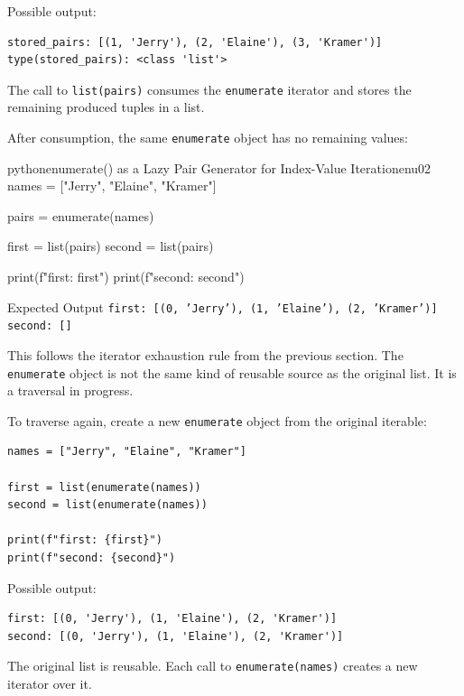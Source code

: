 \documentclass[a4paper,twoside]{report}
\begin{document}
Possible output:

\begin{verbatim}
stored_pairs: [(1, 'Jerry'), (2, 'Elaine'), (3, 'Kramer')]
type(stored_pairs): <class 'list'>
\end{verbatim}

The call to \texttt{list(pairs)} consumes the \texttt{enumerate} iterator and stores the remaining produced tuples in a list.

After consumption, the same \texttt{enumerate} object has no remaining values:

\begin{codebox}[]{python}{enumerate() as a Lazy Pair Generator for Index-Value Iteration}{enu02}
names = ["Jerry", "Elaine", "Kramer"]

pairs = enumerate(names)

first = list(pairs)
second = list(pairs)

print(f"first: {first}")
print(f"second: {second}")
\end{codebox}


\begin{iobox}{Expected Output}
\texttt{first: [(0, 'Jerry'), (1, 'Elaine'), (2, 'Kramer')]} \\
\texttt{second: []} \\
\end{iobox}


This follows the iterator exhaustion rule from the previous section. The \texttt{enumerate} object is not the same kind of reusable source as the original list. It is a traversal in progress.

To traverse again, create a new \texttt{enumerate} object from the original iterable:

\begin{verbatim}
names = ["Jerry", "Elaine", "Kramer"]

first = list(enumerate(names))
second = list(enumerate(names))

print(f"first: {first}")
print(f"second: {second}")
\end{verbatim}

Possible output:

\begin{verbatim}
first: [(0, 'Jerry'), (1, 'Elaine'), (2, 'Kramer')]
second: [(0, 'Jerry'), (1, 'Elaine'), (2, 'Kramer')]
\end{verbatim}

The original list is reusable. Each call to \texttt{enumerate(names)} creates a new iterator over it.
\end{document}
